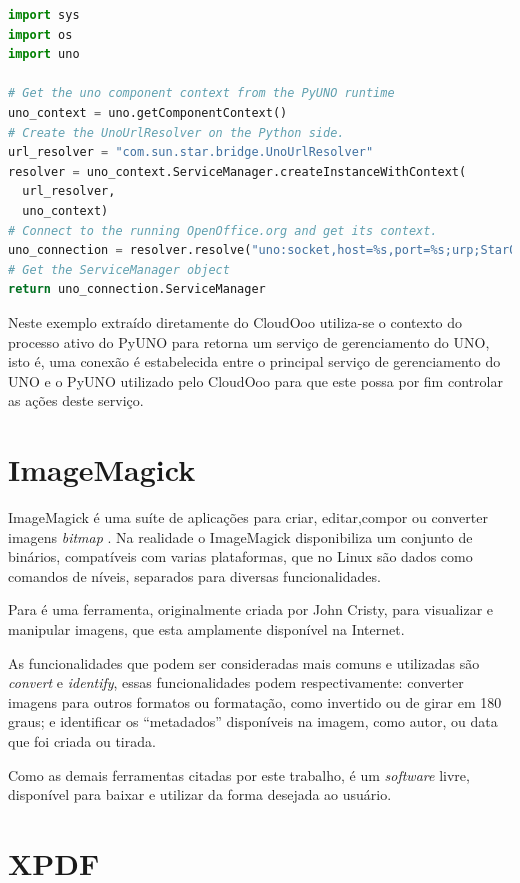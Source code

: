 {\singlespace
\begin{lstlisting}[caption=Exemplo de uso do Uno,language=python,label={example_uno}]
import sys
import os
import uno

# Get the uno component context from the PyUNO runtime
uno_context = uno.getComponentContext()
# Create the UnoUrlResolver on the Python side.
url_resolver = "com.sun.star.bridge.UnoUrlResolver"
resolver = uno_context.ServiceManager.createInstanceWithContext(
  url_resolver,
  uno_context)
# Connect to the running OpenOffice.org and get its context.
uno_connection = resolver.resolve("uno:socket,host=%s,port=%s;urp;StarOffice.ComponentContext" % (host, port))
# Get the ServiceManager object
return uno_connection.ServiceManager
\end{lstlisting}
}

Neste exemplo extraído diretamente do CloudOoo utiliza-se o contexto do processo ativo do PyUNO para retorna um serviço de gerenciamento do UNO, isto é, uma conexão é estabelecida entre o principal serviço de gerenciamento do UNO e o PyUNO utilizado pelo CloudOoo para que este possa por fim controlar as ações deste serviço.


\section{ImageMagick}
\label{imagemagick}

ImageMagick é uma suíte de aplicações para criar, editar,compor ou converter imagens \textit{bitmap} \cite{IMAGEMAGICK-STUDIO}.
Na realidade o ImageMagick disponibiliza um conjunto de binários, compatíveis com varias plataformas, que no Linux são dados como comandos de níveis, separados para diversas funcionalidades.

Para \cite{TESLA} é uma ferramenta, originalmente criada por John Cristy, para visualizar e manipular imagens, que esta amplamente disponível na Internet.

As funcionalidades que podem ser consideradas mais comuns e utilizadas são \textit{convert} e \textit{identify}, essas funcionalidades podem respectivamente: converter imagens para outros formatos ou formatação, como invertido ou de girar em 180 graus; e identificar os ``metadados'' disponíveis na imagem, como autor, ou data que foi criada ou tirada.

Como as demais ferramentas citadas por este trabalho, é um \textit{software} livre, disponível para baixar e utilizar da forma desejada ao usuário.


\section{XPDF}

